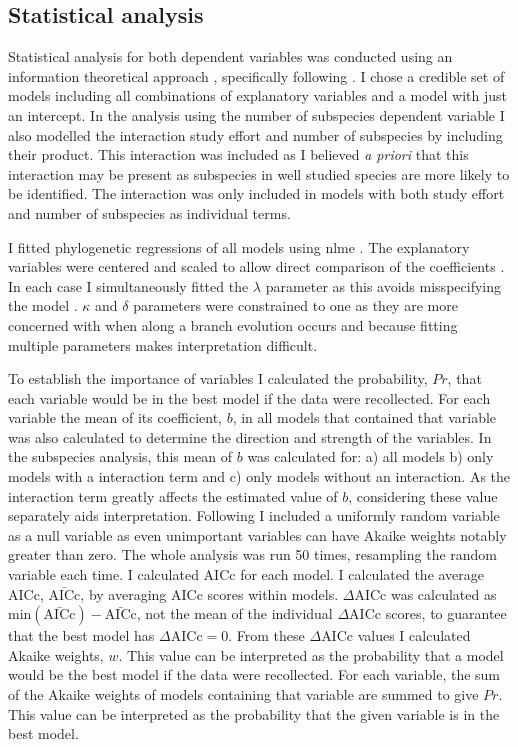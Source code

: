 \subsection{Statistical analysis}

Statistical analysis for both dependent variables was conducted using an information theoretical approach \cite{burnham2002model}, specifically following \textcite{whittingham2005habitat, whittingham2006we}.
I chose a credible set of models including all combinations of explanatory variables and a model with just an intercept.
In the analysis using the number of subspecies dependent variable I also modelled the interaction study effort and number of subspecies by including their product.
This interaction was included as I believed \emph{a priori} that this interaction may be present as subspecies in well studied species are more likely to be identified.
The interaction was only included in models with both study effort and number of subspecies as individual terms.

I fitted phylogenetic regressions of all models using nlme \cite{nlme}.
The explanatory variables were centered and scaled to allow direct comparison of the coefficients \cite{schielzeth2010simple}.
In each case I simultaneously fitted the $\lambda$ parameter as this avoids misspecifying the model \cite{revell2010phylogenetic}.
$\kappa$ and $\delta$ parameters were constrained to one as they are more concerned with when along a branch evolution occurs and because fitting multiple parameters makes interpretation difficult. 

To establish the importance of variables I calculated the probability, $Pr$, that each variable would be in the best model if the data were recollected.
For each variable the mean of its coefficient, $b$, in all models that contained that variable was also calculated to determine the direction and strength of the variables.
In the subspecies analysis, this mean of $b$ was calculated for: a) all models b) only models with a interaction term and c) only models without an interaction.
As the interaction term greatly affects the estimated value of $b$, considering these value separately aids interpretation.
Following \cite{whittingham2005habitat} I included a uniformly random variable as a null variable as even unimportant variables can have Akaike weights notably greater than zero.
The whole analysis was run 50 times, resampling the random variable each time.
I calculated AICc for each model.
I calculated the average AICc, $\bar{\text{AICc}}$, by averaging AICc scores within models.
$\Delta\text{AICc}$ was calculated as $\text{min}(\bar{\text{AICc}}) - \bar{\text{AICc}}$, not the mean of the individual $\Delta\text{AICc}$ scores, to guarantee that the best model has $\Delta\text{AICc} = 0$.
From these $\Delta\text{AICc}$ values I calculated Akaike weights, $w$.
This value can be interpreted as the probability that a model would be the best model if the data were recollected.
For each variable, the sum of the Akaike weights of models containing that variable are summed to give $Pr$.
This value can be interpreted as the probability that the given variable is in the best model.



